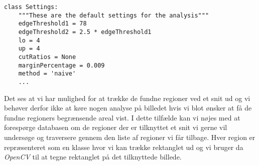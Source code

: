 {\vspace{0.5cm}
\begin{lstlisting}[caption={Settings-klassen med standardindstillinger},captionpos=b,label={settings_klassen},numbers=none]
class Settings:
    """These are the default settings for the analysis"""
    edgeThreshold1 = 78
    edgeThreshold2 = 2.5 * edgeThreshold1
    lo = 4
    up = 4
    cutRatios = None
    marginPercentage = 0.009
    method = 'naive'
    ...
\end{lstlisting}

Det ses at vi har mulighed for at trække de fundne regioner ved et
snit ud og vi behøver derfor ikke at køre nogen analyse på billedet hvis
vi blot ønsker at få de fundne regioners begrænsende areal vist. I dette
tilfælde kan vi nøjes med at forespørge databasen om de regioner der er
tilknyttet et snit vi gerne vil undersøge og traversere gennem den liste
af regioner vi får tilbage. Hver region er repræsenteret som en klasse
hvor vi kan trække rektanglet ud og vi bruger da \emph{OpenCV} til at
tegne rektanglet på det tilknyttede billede.
}

